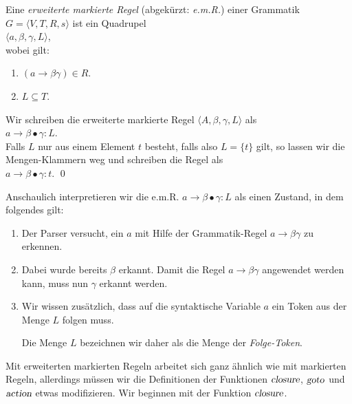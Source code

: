 \begin{Definition}
  Eine \emph{erweiterte markierte Regel} (abgek\"urzt: \emph{e.m.R.}) einer Grammatik 
  $G = \langle V, T, R, s \rangle$ ist ein Quadrupel 
  \\[0.2cm]
  \hspace*{1.3cm}
  $\langle a, \beta, \gamma, L \rangle$,
  \\[0.2cm]
  wobei gilt:
  \begin{enumerate}
  \item $(a \rightarrow \beta \gamma) \in R$.
  \item $L \subseteq T$.
  \end{enumerate}
  Wir schreiben die erweiterte markierte Regel $\langle A, \beta, \gamma, L \rangle$ als
  \\[0.2cm]
  \hspace*{1.3cm}
  $a \rightarrow \beta \bullet \gamma: L$.
  \\[0.2cm]
  Falls $L$ nur aus einem Element $t$ besteht, falls also $L = \{ t \}$ gilt,
  so lassen wir die Mengen-Klammern weg und schreiben die Regel als
  \\[0.2cm]
  \hspace*{1.3cm}
  $a \rightarrow \beta \bullet \gamma:t$. \qed 
\end{Definition}

\noindent
Anschaulich interpretieren wir die e.m.R. $a \rightarrow \beta \bullet \gamma: L$ als einen Zustand,
in dem folgendes gilt:
\begin{enumerate}
\item Der Parser versucht, ein $a$ mit Hilfe der Grammatik-Regel $a \rightarrow \beta \gamma$ zu
      erkennen.
\item Dabei wurde bereits $\beta$ erkannt.  Damit die Regel $a \rightarrow \beta \gamma$
      angewendet werden kann, muss nun  $\gamma$ erkannt werden.
\item Wir wissen zus\"atzlich, dass auf die syntaktische Variable $a$ ein Token aus der Menge $L$
      folgen muss.

      Die Menge $L$ bezeichnen wir daher als die Menge der \emph{Folge-Token}.
\end{enumerate}

Mit erweiterten markierten Regeln arbeitet sich ganz \"ahnlich wie mit markierten Regeln, allerdings
m\"ussen wir die Definitionen der Funktionen $\textsl{closure}$, $\textsl{goto}$ und $\textsl{action}$
etwas modifizieren.  Wir beginnen mit der Funktion $\textsl{closure}$.

